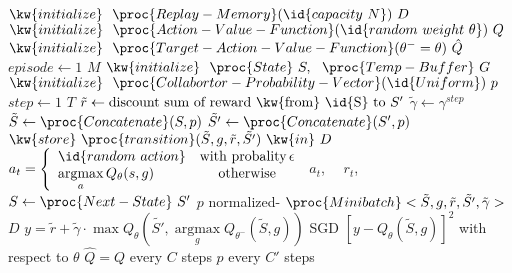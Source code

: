 \documentclass[landscape, 8pt, a4paper]{article}
\DeclareMathOperator*{\argmax}{argmax}
\begin{document}
\begin{multicols}{2}
\begin{center}
\begin{codebox}
\zi {}
\zi \> $\kw{initialize}~~\proc{Replay-Memory}(\id{capacity~N})~D$
\zi \> $\kw{initialize}~~\proc{Action-Value-Function}(\id{random~weight~\theta})~Q$
\zi \> $\kw{initialize}~~\proc{Target-Action-Value-Function}(\theta^{-}=\theta)~\hat{Q}$
\zi	\> \For $episode \gets 1$ \To $M$ \Do
\zi	\> 	$\kw{initialize}~~\proc{State}~S,~~\proc{Temp-Buffer}~G$
\zi	\> 	$\kw{initialize}~~\proc{Collabortor-Probability-Vector}(\id{Uniform})~p$
\zi	\> 	\For $step\gets 1$ \To $T$\Do
\zi	\> 			$\tilde{r}\gets \mbox{discount sum of reward \kw{from} \id{S} to }S'$
\zi	\> 			$\tilde{\gamma}\gets \gamma^{step}$
\zi	\> 			$\tilde{S}\gets \proc{Concatenate}(S,p)$
\zi	\> 			$\tilde{S'}\gets\proc{Concatenate}(S',p)$
\zi	\> 			$\kw{store}~\proc{transition}(\tilde{S},g,\tilde{r},\tilde{S'})~\kw{in}~D$
\zi	\> 			$a_t=\left\{\begin{array}{lc}
								\id{random~action} & \mbox{with probality}\,\epsilon \\
								\argmax\limits_a Q_{\theta}(s,g) & \mbox{otherwise}
					\end{array}\right.$
\zi	\> 			 $a_t$,~~  $r_t$,~~$S\gets\proc{Next-State}~S'$
\zi	\> 			 $p$  normalized-
\zi	\> 		 $\proc{Minibatch}<\tilde{S},g,\tilde{r},\tilde{S'},\tilde{\gamma}>$  $D$
\zi \> 		$y=\tilde{r}+\tilde{\gamma}\cdot\max Q_{\theta}\left(\tilde{S'}, \argmax\limits_{g} Q_{\theta^{-}}(\tilde{S},g)\right)$
\zi \> 		 SGD  $[y-Q_{\theta}(\tilde{S},g)]^2$ with respect to $\theta$
\zi \> 		 $\hat{Q}=Q$ every $C$ steps
			\End
\zi	\> 	  $p$ every $C'$ steps
		\End
\end{codebox}

\end{center}
\end{multicols}
\end{document}
